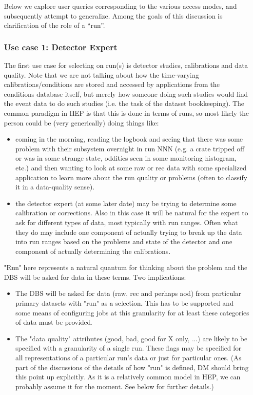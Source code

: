 \documentclass{cmspaper}
\begin{document}
Below we explore user queries corresponding to the various access modes,
and subsequently attempt to generalize. Among the goals of this discussion
is clarification of the role of a ``run''.

\subsubsection{Use case 1: Detector Expert}

  The first use case for selecting on run(s) is detector studies, calibrations
and data quality. Note that we are not talking about how the time-varying 
calibrations/conditions are stored and accessed by applications from the 
conditions database itself, but merely how someone doing such studies would 
find the event data to do such studies (i.e. the task of the dataset 
bookkeeping). The common paradigm in HEP is that this is done in terms
of runs, so most likely the person could be (very generically) doing things 
like:
\begin{itemize}
\item coming in the morning, reading the logbook and seeing that there was
     some problem with their subsystem overnight in run NNN (e.g. a crate 
     tripped off or was in some strange state, oddities seen in some 
     monitoring histogram, etc.) and then wanting to look at some raw or 
     rec data with some specialized application to learn more about the
     run quality or problems (often to classify it in a data-quality sense).
\item the detector expert (at some later date) may be trying to determine
     some calibration or corrections. Also in this case it will be natural
     for the expert to ask for different types of data, most typically with
     run ranges. Often what they do may include one component of actually 
     trying to break up the data into run ranges based on the problems and
     state of the detector and one component of actually determining the
     calibrations. 
\end{itemize}

"Run" here represents a natural quantum for thinking about the problem and
the DBS will be asked for data in these terms. Two implications:
\begin{itemize}
\item The DBS will be asked for data (raw, rec and perhaps aod) from particular
    primary datasets with "run" as a selection. This has to be supported and
    some means of configuring jobs at this granularity for at least these
    categories of data must be provided.

\item The "data quality" attributes (good, bad, good for X only, ...) are likely 
    to be specified with a granularity of a single run. These flags may be
    specified for all representations of a particular run's data or just
    for particular ones. (As part of the discussions of the details of how
    "run" is defined, DM should bring this point up explicitly. As it is a 
    relatively common model in HEP, we can probably assume it for the moment.
    See below for further details.)
\end{itemize}
\end{document}
